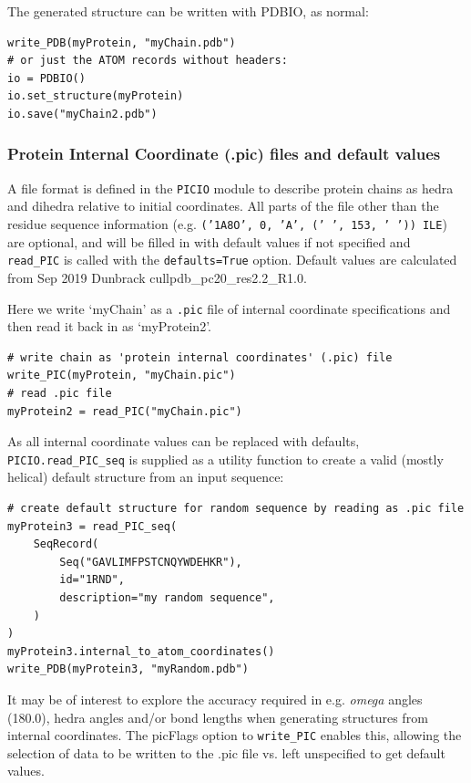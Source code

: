 The generated structure can be written with PDBIO, as normal:

\begin{verbatim}
write_PDB(myProtein, "myChain.pdb")
# or just the ATOM records without headers:
io = PDBIO()
io.set_structure(myProtein)
io.save("myChain2.pdb")
\end{verbatim}

\subsubsection{Protein Internal Coordinate (.pic) files and default values}

A file format is defined in the \texttt{PICIO} module to describe protein chains as hedra and
dihedra relative to initial coordinates.  All parts of the file other than the residue sequence
information (e.g. \texttt{('1A8O', 0, 'A', (' ', 153, ' ')) ILE}) are optional, and will be
filled in with default values if not specified and \texttt{read\_PIC\(\)} is called with the
\texttt{defaults=True} option.  Default values are calculated from Sep 2019 Dunbrack
cullpdb\_pc20\_res2.2\_R1.0.

Here we write `myChain' as a \texttt{.pic} file of internal coordinate specifications and then
read it back in as `myProtein2'.  

\begin{verbatim}
# write chain as 'protein internal coordinates' (.pic) file
write_PIC(myProtein, "myChain.pic")
# read .pic file
myProtein2 = read_PIC("myChain.pic")
\end{verbatim}

As all internal coordinate values can be replaced with defaults, \texttt{PICIO.read\_PIC\_seq\(\)} is
supplied as a utility function to create a valid (mostly helical) default structure from an input
sequence:

\begin{verbatim}
# create default structure for random sequence by reading as .pic file
myProtein3 = read_PIC_seq(
    SeqRecord(
        Seq("GAVLIMFPSTCNQYWDEHKR"),
        id="1RND",
        description="my random sequence",
    )
)
myProtein3.internal_to_atom_coordinates()
write_PDB(myProtein3, "myRandom.pdb")
\end{verbatim}
    
It may be of interest to explore the accuracy required in e.g. \textit{omega} angles (180.0), hedra angles
and/or bond lengths when generating structures from internal coordinates.  The picFlags
option to \texttt{write\_PIC\(\)} enables this, allowing the selection of data to be written
to the .pic file vs. left unspecified to get default values.  

